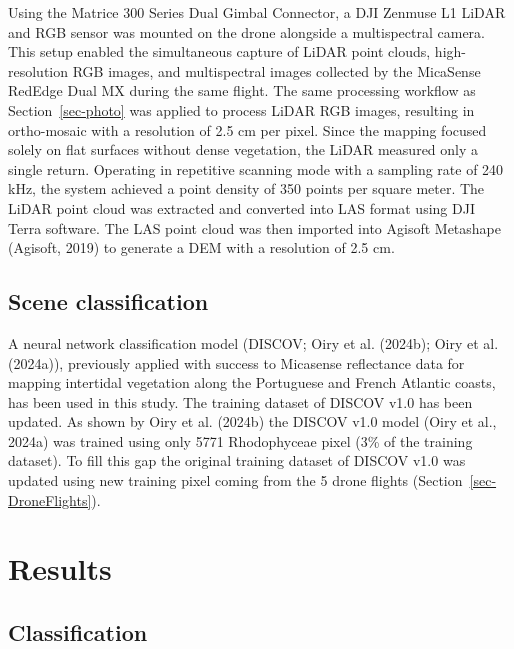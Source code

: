 \documentclass[
  letterpaper,
  DIV=11,
  numbers=noendperiod]{scrartcl}
\begin{document}
Using the Matrice 300 Series Dual Gimbal Connector, a DJI Zenmuse L1
LiDAR and RGB sensor was mounted on the drone alongside a multispectral
camera. This setup enabled the simultaneous capture of LiDAR point
clouds, high-resolution RGB images, and multispectral images collected
by the MicaSense RedEdge Dual MX during the same flight. The same
processing workflow as Section~\ref{sec-photo} was applied to process
LiDAR RGB images, resulting in ortho-mosaic with a resolution of 2.5 cm
per pixel. Since the mapping focused solely on flat surfaces without
dense vegetation, the LiDAR measured only a single return. Operating in
repetitive scanning mode with a sampling rate of 240 kHz, the system
achieved a point density of 350 points per square meter. The LiDAR point
cloud was extracted and converted into LAS format using DJI Terra
software. The LAS point cloud was then imported into Agisoft Metashape
(Agisoft, 2019) to generate a DEM with a resolution of 2.5 cm.

\subsection{Scene classification}\label{scene-classification}

A neural network classification model (DISCOV; Oiry et al. (2024b); Oiry
et al. (2024a)), previously applied with success to Micasense
reflectance data for mapping intertidal vegetation along the Portuguese
and French Atlantic coasts, has been used in this study. The training
dataset of DISCOV v1.0 has been updated. As shown by Oiry et al. (2024b)
the DISCOV v1.0 model (Oiry et al., 2024a) was trained using only 5771
Rhodophyceae pixel (3\% of the training dataset). To fill this gap the
original training dataset of DISCOV v1.0 was updated using new training
pixel coming from the 5 drone flights (Section~\ref{sec-DroneFlights}).

\section{Results}\label{results}

\subsection{Classification}\label{classification}
\end{document}
